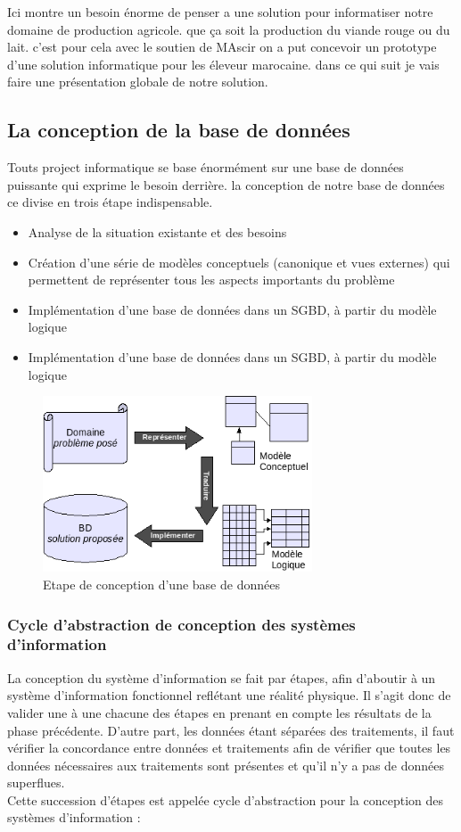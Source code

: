 \documentclass[11pt, a4paper, twoside]{book}
\begin{document}
Ici montre un besoin énorme de penser a une solution pour informatiser notre domaine de production agricole. que ça soit la production du viande rouge ou du lait. c'est pour cela avec le soutien de MAscir on a put concevoir un prototype d'une solution informatique pour les éleveur marocaine. dans ce qui suit je vais faire une présentation globale de notre solution.

\subsection{La conception de la base de données}
Touts project informatique se base énormément sur une base de données puissante qui exprime le besoin derrière. la conception de notre base de données ce divise en trois étape indispensable.
\begin{itemize}
\item 
Analyse de la situation existante et des besoins
\item Création d'une série de modèles conceptuels (canonique et vues externes) qui permettent de représenter tous les aspects importants du problème
\item Implémentation d'une base de données dans un SGBD, à partir du modèle logique
\item Implémentation d'une base de données dans un SGBD, à partir du modèle logique
\end{itemize}

\begin{figure}[H]
\centering
\includegraphics[width=8cm]{db}
\caption{Etape de conception d'une base de données}
\end{figure}

\subsubsection{Cycle d'abstraction de conception des systèmes d'information}
La conception du système d'information se fait par étapes, afin d'aboutir à un système d'information fonctionnel reflétant une réalité physique. Il s'agit donc de valider une à une chacune des étapes en prenant en compte les résultats de la phase précédente. D'autre part, les données étant séparées des traitements, il faut vérifier la concordance entre données et traitements afin de vérifier que toutes les données nécessaires aux traitements sont présentes et qu'il n'y a pas de données superflues.\\
Cette succession d'étapes est appelée cycle d'abstraction pour la conception des systèmes d'information :
\end{document}
